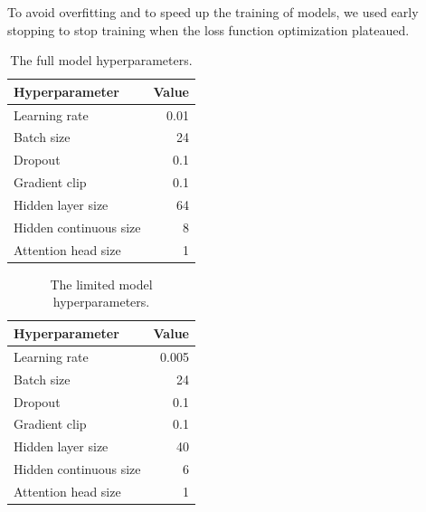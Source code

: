         To avoid overfitting and to speed up the training of models, we used early stopping to stop training when the loss function optimization plateaued. 
        
        \vspace{1.5cm}
    
        \begin{table}[ht!]
        \begin{center}
        \caption{The full model hyperparameters.
        \label{tab:full_params}}
        \vspace{0.5cm}
        \begin{tabular}{|l|r|}
        \hline
        \textbf{Hyperparameter} & \textbf{Value} \\ \hline
        Learning rate            & 0.01         \\ \hline
        Batch size              & 24            \\ \hline
        Dropout                 & 0.1            \\ \hline
        Gradient clip           & 0.1           \\ \hline
        Hidden layer size            & 64         \\ \hline
        Hidden continuous size & 8         \\ \hline
        Attention head size   & 1         \\ \hline
        \end{tabular}
        
        \end{center}
        \end{table}
        
        \begin{table}[ht!]
        \begin{center}
        \caption{The limited model hyperparameters.
        \label{tab:lim_params}}
        \vspace{0.5cm}
        \begin{tabular}{|l|r|}
        \hline
        \textbf{Hyperparameter} & \textbf{Value} \\ \hline
        Learning rate            & 0.005         \\ \hline
        Batch size              & 24            \\ \hline
        Dropout                 & 0.1            \\ \hline
        Gradient clip           & 0.1           \\ \hline
        Hidden layer size            & 40         \\ \hline
        Hidden continuous size & 6         \\ \hline
        Attention head size    & 1         \\ \hline
        \end{tabular}
        
        \end{center}
        \end{table}
    
